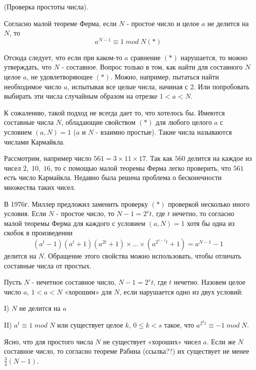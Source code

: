\begin{problem}

(Проверка простоты числа).

Согласно малой теореме Ферма, если $N$ - простое число и целое $a$ не делится на $N$, то  
\[a^{N-1} \equiv 1\; mod\; N                                     \left(*\right)\] 

Отсюда следует, что если при каком-то $a$ сравнение $\left(*\right)$ нарушается, то можно утверждать, что $N$ - составное. Вопрос только в том, как найти для составного $N$ целое $a$, не удовлетворяющее $\left(*\right)$. Можно, например, пытаться найти необходимое число $a$, испытывая все целые числа, начиная с 2. Или попробовать выбирать эти числа случайным образом на отрезке $1<a<N$.

К сожалению, такой подход не всегда дает то, что хотелось бы. Имеются составные числа $N$, обладающие свойством $\left(*\right)$ для любого целого $a$ с условием $\left(a,N\right)=1$ ($a$ и $N$ - взаимно простые). Такие числа называются числами Кармайкла.

Рассмотрим, например число $561=3\times 11\times 17$. Так как $560$ делится на каждое из чисел $2,\; 10,\; 16$, то с помощью малой теоремы Ферма легко проверить, что $561$ есть число Кармайкла. Недавно была решена проблема о бесконечности множества таких чисел.

В 1976г. Миллер предложил заменить проверку $\left(*\right)$ проверкой несколько иного условия. Если $N$ - простое число, то $N-1=2^{s} t$, где $t$ нечетно, то согласно малой теоремы Ферма для каждого  с условием $\left(a,N\right)=1$ хотя бы одна из скобок в произведении 
\[\left(a^{t} -1\right)\left(a^{t} +1\right)\left(a^{2t} +1\right)\times \ldots \times \left(a^{2^{s-1} t} +1\right)=a^{N-1} -1\] 
делится на $N$. Обращение этого свойства можно использовать, чтобы отличать составные числа от простых.

Пусть $N$ - нечетное составное число, $N-1=2^{s} t$, где \textbf{$t$ }нечетно. Назовем целое число $a$, $1<a<N$ «хорошим» для $N$, если нарушается одно из двух условий:

I) $N$ не делится на $a$

II) $a^{t} \equiv 1\; mod\; N$ или существует целое $k$, $0\le k<s$ такое, что $a^{2^{k} t} \equiv -1\; mod\; N$.



Ясно, что для простого числа \textbf{$N$ }не существует «хороших» чисел $a$. Если же $N$ составное число, то согласно теореме Рабина (ссылка??) их существует не менее $\frac{3}{4} \left(N-1\right)$.


\end{problem}
